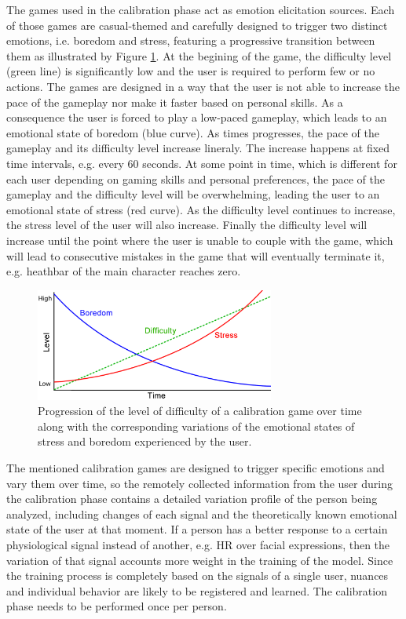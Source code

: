 The games used in the calibration phase act as emotion elicitation sources. Each of those games are casual-themed and carefully designed to trigger two distinct emotions, i.e. boredom and stress, featuring a progressive transition between them as illustrated by Figure \ref{fig:calibration-game-linear}. At the begining of the game, the difficulty level (green line) is significantly low and the user is required to perform few or no actions. The games are designed in a way that the user is not able to increase the pace of the gameplay nor make it faster based on personal skills. As a consequence the user is forced to play a low-paced gameplay, which leads to an emotional state of boredom (blue curve). As times progresses, the pace of the gameplay and its difficulty level increase lineraly. The increase happens at fixed time intervals, e.g. every 60 seconds. At some point in time, which is different for each user depending on gaming skills and personal preferences, the pace of the gameplay and the difficulty level will be overwhelming, leading the user to an emotional state of stress (red curve). As the difficulty level continues to increase, the stress level of the user will also increase. Finally the difficulty level will increase until the point where the user is unable to couple with the game, which will lead to consecutive mistakes in the game that will eventually terminate it, e.g. heathbar of the main character reaches zero.

\begin{figure}[h!]
    \centering
    \includegraphics[width=0.7\textwidth]{figures/calibration-game-linear.png}
    \caption{Progression of the level of difficulty of a calibration game over time along with the corresponding variations of the emotional states of stress and boredom experienced by the user.}
    \label{fig:calibration-game-linear}
\end{figure}

The mentioned calibration games are designed to trigger specific emotions and vary them over time, so the remotely collected information from the user during the calibration phase contains a detailed variation profile of the person being analyzed, including changes of each signal and the theoretically known emotional state of the user at that moment. If a person has a better response to a certain physiological signal instead of another, e.g. HR over facial expressions, then the variation of that signal accounts more weight in the training of the model. Since the training process is completely based on the signals of a single user, nuances and individual behavior are likely to be registered and learned. The calibration phase needs to be performed once per person.

